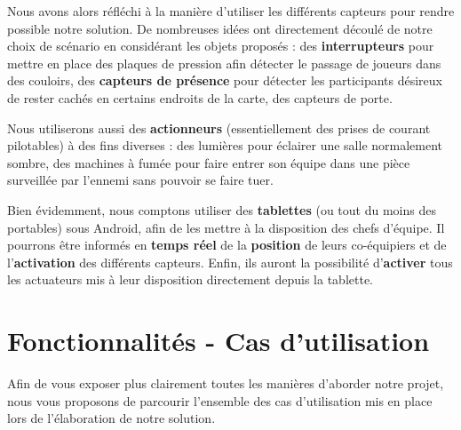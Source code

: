 Nous avons alors réfléchi à la manière d'utiliser les différents capteurs pour rendre possible notre solution. De nombreuses idées ont directement découlé de notre choix de scénario en considérant les objets proposés : des \textbf{interrupteurs }pour mettre en place des plaques de pression afin détecter le passage de joueurs dans des couloirs, des \textbf{capteurs de présence }pour détecter les participants désireux de rester cachés en certains endroits de la carte, des capteurs de porte. 

Nous utiliserons aussi des \textbf{actionneurs }(essentiellement des prises de courant pilotables) à des fins diverses : des lumières pour éclairer une salle normalement sombre, des machines à fumée pour faire entrer son équipe dans une pièce surveillée par l'ennemi sans pouvoir se faire tuer.

Bien évidemment, nous comptons utiliser des \textbf{tablettes }(ou tout du moins des portables) sous Android, afin de les mettre à la disposition des chefs d'équipe. Il pourrons être informés en \textbf{temps réel }de la \textbf{position }de leurs co-équipiers et de l'\textbf{activation }des différents capteurs. Enfin, ils auront la possibilité d'\textbf{activer }tous les actuateurs mis à leur disposition directement depuis la tablette.


\section{Fonctionnalités - Cas d'utilisation}

Afin de vous exposer plus clairement toutes les manières d'aborder notre projet, nous vous proposons de parcourir l'ensemble des cas d'utilisation mis en place lors de l'élaboration de notre solution.


